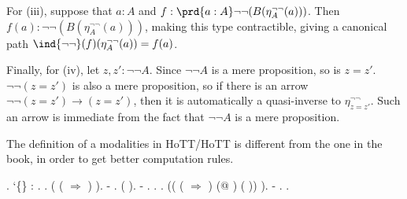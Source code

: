 For (iii), suppose that $a : A$ and $f : \prd{a :
A}\lnot\lnot(B(\eta^{\lnot\lnot}_{A}(a)))$.  Then $f(a) : \lnot \lnot
(B(\eta^{\lnot\lnot}_{A}(a)))$, making this type contractible, giving a
canonical path $\ind{\lnot\lnot}(f)(\eta^{\lnot\lnot}_{A}(a)) = f(a)$.


Finally, for (iv), let $z, z' : \lnot\lnot A$.  Since $\lnot\lnot A$ is a mere
proposition, so is $z = z'$.  $\lnot\lnot(z = z')$ is also a mere proposition,
so if there is an arrow $\lnot\lnot(z = z') \to (z = z')$, then it is
automatically a quasi-inverse to $\eta^{\lnot\lnot}_{z = z'}$.  Such an arrow
is immediate from the fact that $\lnot \lnot A$ is a mere proposition.


The definition of a modalities in HoTT/HoTT is different from the one
in the book, in order to get better computation rules.
\begin{coqdoccode}
\coqdocemptyline
\coqdocnoindent
{} .\coqdoceol
\coqdocemptyline
\coqdocnoindent
{}  `\{\} : .\coqdoceol
\coqdocnoindent
{}.\coqdoceol
\coqdocindent{1.00em}
 ( (  \ensuremath{\Rightarrow} \coqdocnotation{\ensuremath{\lnot}} \coqdocnotation{\ensuremath{\lnot}} ) \coqdocvar{\_} \coqdocvar{\_} \coqdocvar{\_} \coqdocvar{\_}).\coqdoceol
\coqdocindent{1.00em}
-    .  ( ).\coqdoceol
\coqdocindent{1.00em}
-      .\coqdoceol
\coqdocindent{2.00em}
 .  .\coqdoceol
\coqdocindent{2.00em}
 (( (  \ensuremath{\Rightarrow} \coqdocnotation{\ensuremath{\lnot}} \coqdocnotation{\ensuremath{\lnot}} \coqdocnotation{(} \coqdocnotation{)}) \coqdoceol
\coqdocindent{11.50em}
(@ \coqdocvar{\_} \coqdocvar{\_} \coqdocvar{\_} \coqdocvar{\_})\coqdoceol
\coqdocindent{11.50em}
( )) ).\coqdoceol
\coqdocindent{1.00em}
-     .  .\coqdoceol
\coqdocindent{1.00em}

\end{coqdoccode}
